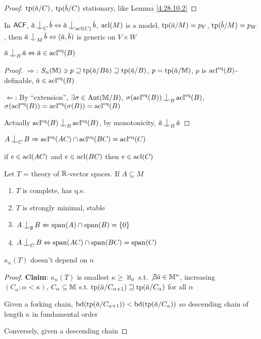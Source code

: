 \documentclass[11pt]{article}
\DeclareMathOperator{\tbd}{bd}
\begin{document}
\begin{proof}
\(\tp(\bara/C)\), \(\tp(\barb/C)\) stationary, like Lemma \ref{4.28.10.2}
\end{proof}

In \(\textsf{ACF}\), \(\bara\ind_C\barb\Leftrightarrow\bara\ind_{\acl(C)}\barb\), \(\operatorname{acl}(M)\) is a
model, \(\tp(\bara/M)=p_V\), \(\tp(\barb/M)=p_W\), then \(\bara\ind_M\barb\Leftrightarrow(\bara,\barb)\) is
generic on \(V\times W\)

\begin{proposition}[]
\(\bara\ind_B\bara\Leftrightarrow\bara\in\acl^{\eq}(B)\)
\end{proposition}

\begin{proof}
\(\Rightarrow\): \(S_n(\M)\ni p\sqsupseteq\tp(\bara/B\bara)\sqsupseteq\tp(\bara/B)\), \(p=\tp(\bara/\M)\), \(p\)
is \(\operatorname{acl}^{\operatorname{eq}}(B)\)-definable, \(\bara\in\acl^{\eq}(B)\)

\(\Leftarrow\): By ``extension'', \(\exists\sigma\in\operatorname{\text{Aut}}(\mathbb{M}/B)\), \(\sigma(\acl^{\eq}(B))\ind_B\acl^{\eq}(B)\),
\(\sigma(\operatorname{acl}^{\operatorname{eq}}(B))=\operatorname{acl}^{\operatorname{eq}}(\sigma(B))=\operatorname{acl}^{\operatorname{eq}}(B)\)

Actually \(\acleq(B)\ind_B\acleq(B)\), by monotonicity, \(\bara\ind_B\bara\)
\end{proof}

\begin{proposition}[]
\(A\ind_CB\Rightarrow\acleq(AC)\cap\acleq(BC)=\acleq(C)\)
\end{proposition}


if \(e\in\operatorname{acl}(AC)\) and \(e\in\operatorname{acl}(BC)\) then \(e\in\operatorname{acl}(C)\)

\begin{proposition}[]
Let \(T\) = theory of \(\mathbb{R}\)-vector spaces. If \(A\subseteq M\)
\begin{enumerate}
\item \(T\) is complete, has q.e.
\item \(T\) is strongly minimal, stable
\item \(A\ind_\emptyset B\Leftarrow\tspan(A)\cap\tspan(B)=\{0\}\)
\item \(A\ind_CB\Leftrightarrow\tspan(AC)\cap\tspan(BC)=\tspan(C)\)
\end{enumerate}
\end{proposition}

\begin{proposition}[]
\(\kappa_n(T)\) doesn't depend on \(n\)
\end{proposition}

\begin{proof}
\textbf{Claim}:  \(\kappa_n(T)\) is smallest \(\kappa\ge\aleph_0\) s.t. \(\not\exists\bara\in\M^n\),
increasing \((C_\alpha:\alpha<\kappa)\), \(C_\alpha\subseteq\mathbb{M}\) s.t. \(\tp(\bara/C_{\alpha+1})\sqsupseteq\tp(\bara/C_\alpha)\) for all \(\alpha\)

Given a forking chain, \(\tbd(\tp(\bara/C_{\alpha+1}))<\tbd(\tp(\bara/C_\alpha))\) so descending chain of
length \(\kappa\) in fundamental order

Conversely, given a descending chain
\end{proof}
\end{document}
